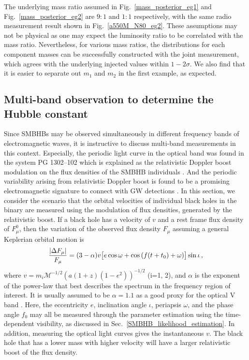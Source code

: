 \documentclass[twocolumn]{aastex62}
\def\m{\begin{eqnarray}}
\def\n{\end{eqnarray}}
\begin{document}
The underlying mass ratio assumed in  Fig.~\ref{mass_posterior_eg1} and Fig.~\ref{mass_posterior_eg2} are $9:1$ and $1:1$ respectively, with the same radio measurement result shown in  Fig.~\ref{a550M_N80_eg2}. These assumptions may not be physical as one may expect the luminosity ratio to be correlated with the mass ratio. Nevertheless, for various mass ratios, the distributions for each component masses can be successfully constructed with the joint measurement, which agrees with the underlying injected values within $1-2 \sigma$. We also find that it is easier to separate out $m_1$ and $m_2$ in the first example, as expected.


\subsection{Multi-band observation to determine the Hubble constant}
\label{multifrequency}
%
Since SMBHBs may be observed simultaneously in different frequency bands of electromagnetic waves, it is instructive to discuss multi-band measurements in this context. Especially, the periodic light curve in the optical band was found in the system PG 1302–102 which is explained as the relativistic Doppler boost modulation on the flux densities of the SMBHB individuals \citep{Graham2015, DOrazio:2015nature}. 
And the periodic variability arising from relativistic Doppler boost is found to be a promising electromagnetic signature to connect with GW detections \citep{Charisi:2021dwc}. 
In this section, we consider the scenario that the orbital velocities of  individual black holes in the binary are measured using the modulation of flux densities, generated by the relativistic boost. If a black hole has a velocity of $v$ and a rest frame flux density of $F^0_{\mu}$, then the variation of the observed flux density $F_{\mu}$ assuming a general Keplerian orbital motion is 
\m
{|\Delta F_{\mu}|\over F_{\mu}}=(3-\alpha)v \big[ e \cos{\omega}+\cos{\left( f(t+t_0) + \omega \right)} \big] \sin{\iota}\,, \nonumber \\
\n
 where $v=m_i {\mathcal{M}}^{-1/2}  (a(1+z)(1-e^2))^{-1/2}$ (i=1, 2), and $\alpha$ is the exponent of the power-law that best describes the spectrum in the frequency region of interest. It is usually assumed to be $\alpha= 1.1$ as a good proxy for the optical V band \citep{DOrazio:2015nature, Dotti:2021bjm}. Here, the eccentricity $e$, inclination angle $\iota$, periapsis $\omega$, and  the phase angle $f_0$ may all be measured through the parameter estimation using the time-dependent visibility, as discussed in Sec.~\ref{SMBHB_likelihood_estimation}. In addition, measuring the optical light curves gives the instantaneous $v$. The black hole that has a lower mass with higher velocity will have a larger relativistic boost of the flux density.  
 
\end{document}
